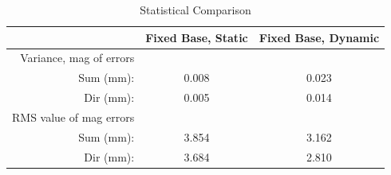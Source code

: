 \begin{table}[htbp] \caption{Statistical Comparison} \centering
\begin{tabular}{r||c|c} \hline
                & Fixed Base, Static  &  Fixed Base, Dynamic \\
    \hline \hline
    Variance, mag of errors & & \\
        Sum (mm): & 0.008 & 0.023 \\
        Dir (mm): & 0.005 & 0.014 \\ \hline
    RMS value of mag errors & & \\
        Sum (mm): & 3.854 & 3.162 \\
        Dir (mm): & 3.684 & 2.810 \\ \hline
\end{tabular} \label{tab:turb_interp} \end{table}

